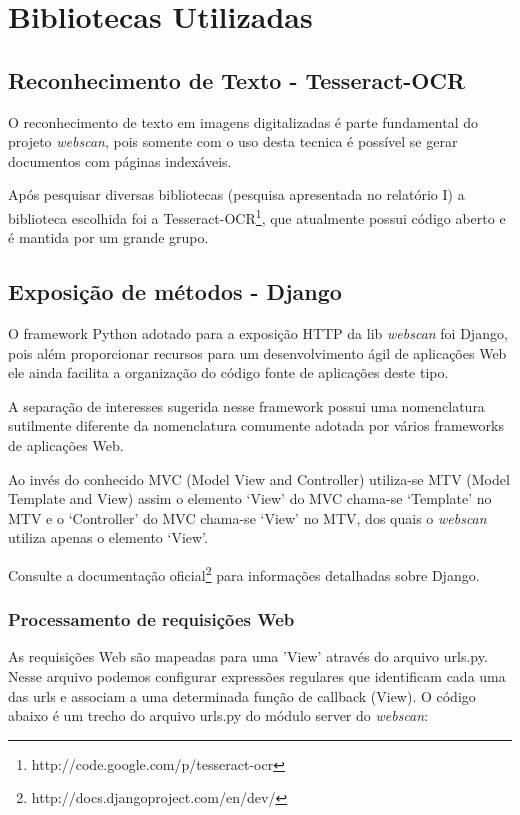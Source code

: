 \section{Bibliotecas Utilizadas}
\label{sec:bibs}

\subsection{Reconhecimento de Texto - Tesseract-OCR}

O reconhecimento de texto em imagens digitalizadas é parte
fundamental do projeto {\it webscan}, pois somente com o uso desta 
tecnica é possível se gerar documentos com páginas indexáveis.

Após pesquisar diversas bibliotecas (pesquisa apresentada no relatório I)
a biblioteca escolhida foi a 
Tesseract-OCR\footnote{http://code.google.com/p/tesseract-ocr}, que atualmente
possui código aberto e é mantida por um grande grupo.


\subsection{Exposição de métodos - Django}
O framework Python adotado para a exposição HTTP da lib {\it webscan} foi 
Django, pois além proporcionar recursos para um desenvolvimento ágil de 
aplicações Web ele ainda facilita a organização do código fonte de aplicações
deste tipo.
 
A separação de interesses sugerida nesse framework possui uma nomenclatura 
sutilmente diferente da nomenclatura comumente adotada por vários frameworks 
de aplicações Web. 

Ao invés do conhecido MVC (Model View and Controller) utiliza-se 
MTV (Model Template and View) assim o elemento `View' do MVC chama-se 
`Template' no MTV e o `Controller' do MVC chama-se `View' no MTV, dos 
quais o {\it webscan} utiliza apenas o elemento `View'. 

Consulte a documentação oficial\footnote{http://docs.djangoproject.com/en/dev/}
para informações detalhadas sobre Django.

\subsubsection{Processamento de requisições Web}

As requisições Web são mapeadas para uma 'View' através do arquivo urls.py.
Nesse arquivo podemos configurar expressões regulares que identificam cada 
uma das urls e associam a uma determinada função de callback (View). O 
código abaixo é um trecho do arquivo urls.py do módulo server do 
{\it webscan}: 


